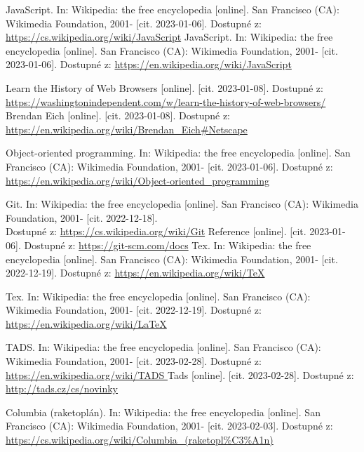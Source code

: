 \documentclass[main.tex]{subfiles}
\begin{document}
\begin{thebibliography}{99}
 JavaScript. In: Wikipedia: the free encyclopedia [online]. San Francisco (CA): Wikimedia Foundation, 2001- [cit. 2023-01-06]. Dostupné z: \url{https://cs.wikipedia.org/wiki/JavaScript}
 JavaScript. In: Wikipedia: the free encyclopedia [online]. San Francisco (CA): Wikimedia Foundation, 2001- [cit. 2023-01-06]. Dostupné z: \url{https://en.wikipedia.org/wiki/JavaScript}

 Learn the History of Web Browsers [online]. [cit. 2023-01-08]. Dostupné z: \url{https://washingtonindependent.com/w/learn-the-history-of-web-browsers/}
 Brendan Eich [online]. [cit. 2023-01-08]. Dostupné z: \url{https://en.wikipedia.org/wiki/Brendan\_Eich#Netscape}

Object-oriented programming. In: Wikipedia: the free encyclopedia [online]. San Francisco (CA): Wikimedia Foundation, 2001- [cit. 2023-01-06]. Dostupné z: \url{https://en.wikipedia.org/wiki/Object-oriented\_programming}

 Git. In: Wikipedia: the free encyclopedia [online]. San Francisco (CA): Wikimedia Foundation, 2001- [cit. 2022-12-18].\\ Dostupné z: \url{https://cs.wikipedia.org/wiki/Git}
 Reference [online]. [cit. 2023-01-06]. Dostupné z: \url{https://git-scm.com/docs}
 Tex. In: Wikipedia: the free encyclopedia [online]. San Francisco (CA): Wikimedia Foundation, 2001- [cit. 2022-12-19]. Dostupné z: \url{https://en.wikipedia.org/wiki/TeX}

 Tex. In: Wikipedia: the free encyclopedia [online]. San Francisco (CA): Wikimedia Foundation, 2001- [cit. 2022-12-19]. Dostupné z: \url{https://en.wikipedia.org/wiki/LaTeX}

 TADS. In: Wikipedia: the free encyclopedia [online]. San Francisco (CA): Wikimedia Foundation, 2001- [cit. 2023-02-28]. Dostupné z: \url{ https://en.wikipedia.org/wiki/TADS }
 Tads [online]. [cit. 2023-02-28]. Dostupné z: \url{http://tads.cz/cs/novinky}
 

 Columbia (raketoplán). In: Wikipedia: the free encyclopedia [online]. San Francisco (CA): Wikimedia Foundation, 2001- [cit. 2023-02-03]. Dostupné z: \url{https://cs.wikipedia.org/wiki/Columbia\_(raketopl\%C3\%A1n) }

\end{thebibliography}
\end{document}
